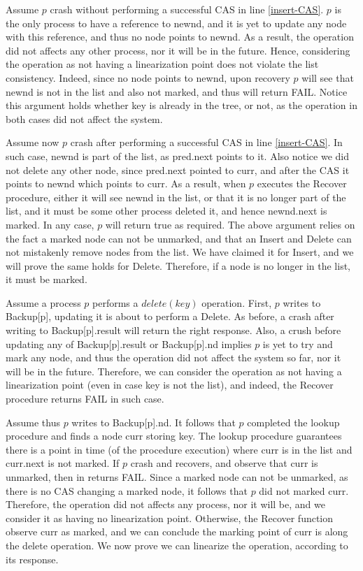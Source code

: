 Assume $p$ crash without performing a successful CAS in line \ref{insert-CAS}. $p$ is the only process to have a reference to newnd, and it is yet to update any node with this reference, and thus no node points to newnd. As a result, the operation did not affects any other process, nor it will be in the future. Hence, considering the operation as not having a linearization point does not violate the list consistency. Indeed, since no node points to newnd, upon recovery $p$ will see that newnd is not in the list and also not marked, and thus will return FAIL. Notice this argument holds whether key is already in the tree, or not, as the operation in both cases did not affect the system.

Assume now $p$ crash after performing a successful CAS in line \ref{insert-CAS}. In such case, newnd is part of the list, as pred.next points to it. Also notice we did not delete any other node, since pred.next pointed to curr, and after the CAS it points to newnd which points to curr. As a result, when $p$ executes the Recover procedure, either it will see newnd in the list, or that it is no longer part of the list, and it must be some other process deleted it, and hence newnd.next is marked. In any case, $p$ will return true as required.
The above argument relies on the fact a marked node can not be unmarked, and that an Insert and Delete can not mistakenly remove nodes from the list. We have claimed it for Insert, and we will prove the same holds for Delete. Therefore, if a node is no longer in the list, it must be marked.

Assume a process $p$ performs a $delete(key)$ operation. First, $p$ writes to Backup[p], updating it is about to perform a Delete. As before, a crash after writing to Backup[p].result will return the right response. Also, a crush before updating any of Backup[p].result or Backup[p].nd implies $p$ is yet to try and mark any node, and thus the operation did not affect the system so far, nor it will be in the future. Therefore, we can consider the operation as not having a linearization point (even in case key is not the list), and indeed, the Recover procedure returns FAIL in such case.

Assume thus $p$ writes to Backup[p].nd. It follows that $p$ completed the lookup procedure and finds a node curr storing key. The lookup procedure guarantees there is a point in time (of the procedure execution) where curr is in the list and curr.next is not marked. If $p$ crash and recovers, and observe that curr is unmarked, then in returns FAIL. Since a marked node can not be unmarked, as there is no CAS changing a marked node, it follows that $p$ did not marked curr. Therefore, the operation did not affects any process, nor it will be, and we consider it as having no linearization point. Otherwise, the Recover function observe curr as marked, and we can conclude the marking point of curr is along the delete operation. We now prove we can linearize the operation, according to its response.

